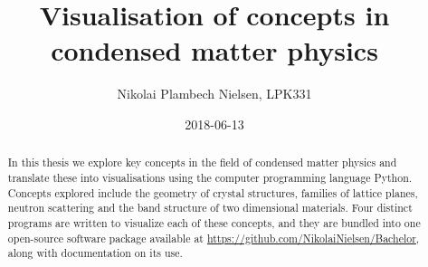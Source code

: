 \documentclass[a4paper,11pt]{article}
\title{Visualisation of concepts in condensed matter physics}
\author{Nikolai Plambech Nielsen, LPK331}
\date{2018-06-13}
\numberwithin{equation}{section}
\begin{document}
	
	
	
	
	\begin{abstract}
		In this thesis we explore key concepts in the field of condensed matter physics and translate these into visualisations using the computer programming language Python. Concepts explored include the geometry of crystal structures, families of lattice planes, neutron scattering and the band structure of two dimensional materials. Four distinct programs are written to visualize each of these concepts, and they are bundled into one open-source software package available at \url{https://github.com/NikolaiNielsen/Bachelor}, along with documentation on its use.
	\end{abstract}
	\tableofcontents
	
	\newpage
	
	\setcounter{page}{1}
	
	
	
	
	
	
	
	
	
	
	
	
	
	\newpage
	\appendix
	
	
\end{document}
